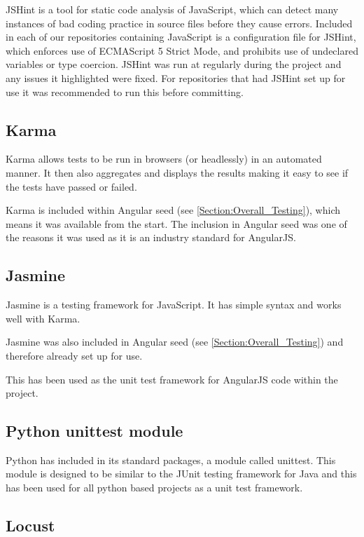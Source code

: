 JSHint is a tool for static code analysis of JavaScript, which can detect many instances of bad coding practice in source files before they cause errors. Included in each of our repositories containing JavaScript is a configuration file for JSHint, which enforces use of ECMAScript 5 Strict Mode, and prohibits use of undeclared variables or type coercion. JSHint was run at regularly during the project and any issues it highlighted were fixed. For repositories that had JSHint set up for use it was recommended to run this before committing.

\subsection{Karma}

Karma allows tests to be run in browsers (or headlessly) in an automated manner.  It then also aggregates and displays the results making it easy to see if the tests have passed or failed.

Karma is included within Angular seed (see \autoref{Section:Overall_Testing}), which means it was available from the start. The inclusion in Angular seed was one of the reasons it was used as it is an industry standard for AngularJS.

\subsection{Jasmine}

Jasmine is a testing framework for JavaScript. It has simple syntax and works well with Karma.

Jasmine was also included in Angular seed (see \autoref{Section:Overall_Testing}) and therefore already set up for use.

This has been used as the unit test framework for AngularJS code within the project.

\subsection{Python unittest module}

Python has included in its standard packages, a module called unittest. This module is designed to be similar to the JUnit testing framework for Java and this has been used for all python based projects as a unit test framework.

\subsection{Locust}

